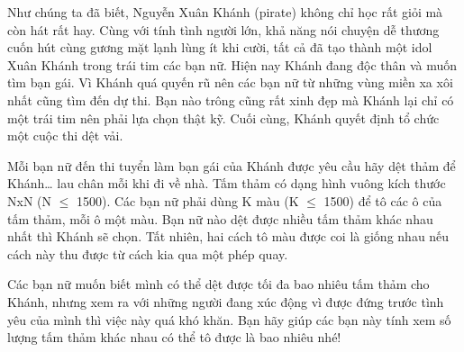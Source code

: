 Như chúng ta đã biết, Nguyễn Xuân Khánh (pirate) không chỉ học rất giỏi mà còn hát rất hay. Cùng với tính tình người lớn, khả năng nói chuyện dễ thương cuốn hút cùng gương mặt lạnh lùng ít khi cười, tất cả đã tạo thành một idol Xuân Khánh trong trái tim các bạn nữ. Hiện nay Khánh đang độc thân và muốn tìm bạn gái. Vì Khánh quá quyến rũ nên các bạn nữ từ những vùng miền xa xôi nhất cũng tìm đến dự thi. Bạn nào trông cũng rất xinh đẹp mà Khánh lại chỉ có một trái tim nên phải lựa chọn thật kỹ. Cuối cùng, Khánh quyết định tổ chức một cuộc thi dệt vải.   





   Mỗi bạn nữ đến thi tuyển làm bạn gái của Khánh được yêu cầu hãy dệt thảm để Khánh… lau chân mỗi khi đi về nhà. Tấm thảm có dạng hình vuông kích thước NxN (N $\le$ 1500). Các bạn nữ phải dùng K màu (K $\le$ 1500) để tô các ô của tấm thảm, mỗi ô một màu. Bạn nữ nào dệt được nhiều tấm thảm khác nhau nhất thì Khánh sẽ chọn. Tất nhiên, hai cách tô màu được coi là giống nhau nếu cách này thu được từ cách kia qua một phép quay.   





   Các bạn nữ muốn biết mình có thể dệt được tối đa bao nhiêu tấm thảm cho Khánh, nhưng xem ra với những người đang xúc động vì được đứng trước tình yêu của mình thì việc này quá khó khăn. Bạn hãy giúp các bạn này tính xem số lượng tấm thảm khác nhau có thể tô được là bao nhiêu nhé!